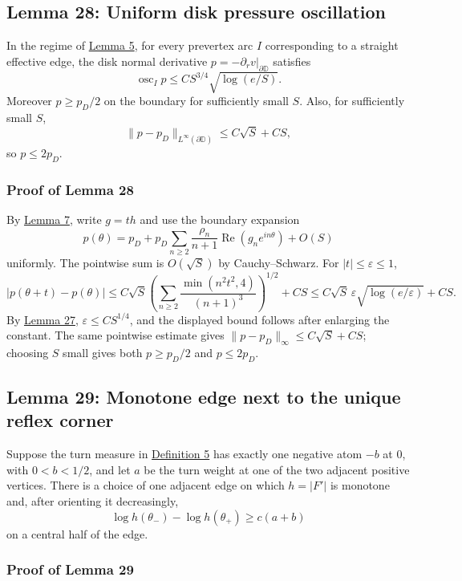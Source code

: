 \documentclass[11pt]{article}
\begin{document}
\subsection{Lemma 28: Uniform disk pressure
oscillation}\label{lem-edge-pressure-oscillation}

In the regime of \hyperref[lem-disk-perturbation]{Lemma 5}, for every
prevertex arc \(I\) corresponding to a straight effective edge, the disk
normal derivative \(p=-\partial_rv|_{\partial\mathbb D}\) satisfies \[
\operatorname{osc}_I p
\le C S^{3/4}\sqrt{\log(e/S)}.
\] Moreover \(p\ge p_D/2\) on the boundary for sufficiently small \(S\).
Also, for sufficiently small \(S\), \[
\|p-p_D\|_{L^\infty(\partial\mathbb D)}\le C\sqrt S+CS,
\] so \(p\le2p_D\).

\subsubsection{Proof of Lemma
28}\label{proof-lem-edge-pressure-oscillation}

By \hyperref[lem-gradient-perturbation]{Lemma 7}, write \(g=th\) and use
the boundary expansion \[
p(\theta)=p_D+p_D\sum_{n\ge2}\frac{\rho_n}{n+1}\operatorname{Re}(g_ne^{in\theta})+O(S)
\] uniformly. The pointwise sum is \(O(\sqrt S)\) by Cauchy--Schwarz.
For \(|t|\le\varepsilon\le1\), \[
|p(\theta+t)-p(\theta)|
\le C\sqrt S\left(\sum_{n\ge2}\frac{\min(n^2t^2,4)}{(n+1)^3}\right)^{1/2}+CS
\le C\sqrt S\,\varepsilon\sqrt{\log(e/\varepsilon)}+CS.
\] By \hyperref[lem-prevertex-gap]{Lemma 27},
\(\varepsilon\le CS^{1/4}\), and the displayed bound follows after
enlarging the constant. The same pointwise estimate gives
\(\|p-p_D\|_\infty\le C\sqrt S+CS\); choosing \(S\) small gives both
\(p\ge p_D/2\) and \(p\le2p_D\).

\subsection{Lemma 29: Monotone edge next to the unique reflex
corner}\label{lem-reflex-monotone-edge}

Suppose the turn measure in \hyperref[def-turn-measure]{Definition 5}
has exactly one negative atom \(-b\) at \(0\), with \(0<b<1/2\), and let
\(a\) be the turn weight at one of the two adjacent positive vertices.
There is a choice of one adjacent edge on which \(h=|F'|\) is monotone
and, after orienting it decreasingly, \[
\log h(\theta_-)-\log h(\theta_+)\ge c(a+b)
\] on a central half of the edge.

\subsubsection{Proof of Lemma 29}\label{proof-lem-reflex-monotone-edge}
\end{document}
